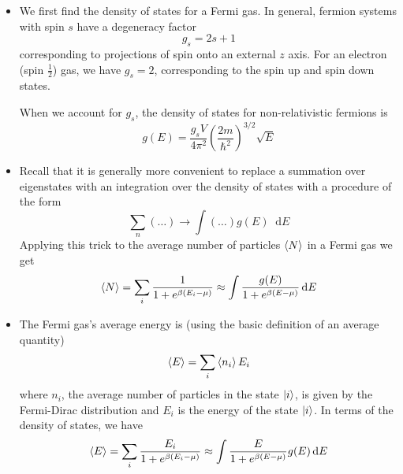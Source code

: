 \documentclass[11pt, a4paper]{article}
\newcommand{\diff}{\mathop{}\!\mathrm{d}} %
\begin{document}
\begin{itemize}
	\item We first find the density of states for a Fermi gas. In general, fermion systems with spin $ s $ have a degeneracy factor
	\begin{equation*}
		g_{s} = 2s + 1
	\end{equation*}
	corresponding to projections of spin onto an external $ z $ axis. For an electron (spin $\frac{1}{2}$) gas, we have $ g_{s} = 2 $, corresponding to the spin up and spin down states.
	
	When we account for $ g_{s} $, the density of states for non-relativistic fermions is
	\begin{equation*}
		g(E) =  \frac{g_{s}V}{4\pi^{2}} \left(\frac{2m}{\hbar^{2}}\right)^{3/2} \sqrt{E}
	\end{equation*}
	
	
	\item Recall that it is generally more convenient to replace a summation over eigenstates with an integration over the density of states with a procedure of the form
	\begin{equation*}
		\sum_{n} (\ldots) \to \int (\ldots) g(E) \diff E 
	\end{equation*}
	Applying this trick to the average number of particles $ \expval{N} $ in a Fermi gas we get
	\begin{equation*}
		\expval{N} = \sum_{i} \frac{1}{1 + e^{\beta (E_{i} - \mu)}} \approx \int  \frac{g(E)}{1 + e^{\beta (E - \mu)}}  \diff E 
	\end{equation*}
	
	\item The Fermi gas's average energy is (using the basic definition of an average quantity)
	\begin{equation*}
		 \expval{E} = \sum_{i} \expval{n_{i}} E_{i}
	\end{equation*}
	where $ n_{i} $, the average number of particles in the state $ \ket{i} $, is given by the Fermi-Dirac distribution and $ E_{i} $ is the energy of the state $ \ket{i} $. In terms of the density of states, we have
	\begin{equation*}
		\expval{E} = \sum_{i}  \frac{E_{i}}{1 + e^{\beta (E_{i} - \mu)}} \\\approx \int  \frac{E }{1 + e^{\beta (E - \mu)}}  g(E) \diff E 
	\end{equation*}
	

\end{itemize}
\end{document}
